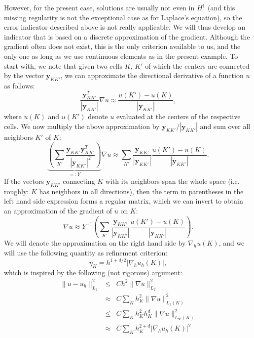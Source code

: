 \documentclass{article}
\renewcommand{\vec}[1]{{\mathbf #1}}
\begin{document}
However, for the present case, solutions are usually not even in $H^1$
(and this missing regularity is not the exceptional case as for
Laplace's equation), so the error indicator described above is not
really applicable. We will thus develop an indicator that is based on
a discrete approximation of the gradient. Although the gradient often
does not exist, this is the only criterion available to us, and the
only one as long as we use continuous elements as in the present
example. To start with, we note that given two cells $K$, $K'$ of
which the centers are connected by the vector $\vec y_{KK'}$, we can
approximate the directional derivative of a function $u$ as follows:
$$
  \frac{\vec y_{KK'}^T}{|\vec y_{KK'}|} \nabla u
  \approx
  \frac{u(K') - u(K)}{|\vec y_{KK'}|},
$$
where $u(K)$ and $u(K')$ denote $u$ evaluated at the centers of the
respective cells. We now multiply the above approximation by 
$\vec y_{KK'}/|\vec y_{KK'}|$ and sum over all neighbors $K'$ of $K$:
$$
  \underbrace{
    \left(\sum_{K'} \frac{\vec y_{KK'} \vec y_{KK'}^T}
                         {|\vec y_{KK'}|^2}\right)}_{=:Y}
  \nabla u
  \approx
  \sum_{K'}
  \frac{\vec y_{KK'}}{|\vec y_{KK'}|}
  \frac{u(K') - u(K)}{|\vec y_{KK'}|}.
$$
If the vectors $\vec y_{KK'}$ connecting $K$ with its neighbors span
the whole space (i.e. roughly: $K$ has neighbors in all directions),
then the term in parentheses in the left hand side expression forms a
regular matrix, which we can invert to obtain an approximation of the
gradient of $u$ on $K$:
$$
  \nabla u
  \approx
  Y^{-1}
  \left(
    \sum_{K'}
    \frac{\vec y_{KK'}}{|\vec y_{KK'}|}
    \frac{u(K') - u(K)}{|\vec y_{KK'}|}
  \right).
$$
We will denote the approximation on the right hand side by
$\nabla_h u(K)$, and we will use the following quantity as refinement
criterion:
$$
  \eta_K = h^{1+d/2} |\nabla_h u_h(K)|,
$$
which is inspired by the following (not rigorous) argument:
\begin{eqnarray*}
  \|u-u_h\|^2_{L_2} 
  &\le&
  C h^2 \|\nabla u\|^2_{L_2}
\\
  &\approx&
  C
  \sum_K
  h_K^2 \|\nabla u\|^2_{L_2(K)}
\\
  &\le&
  C
  \sum_K
  h_K^2 h_K^d \|\nabla u\|^2_{L_\infty(K)}
\\
  &\approx&
  C
  \sum_K
  h_K^{2+d} |\nabla_h u_h(K)|^2
\end{eqnarray*}
\end{document}
